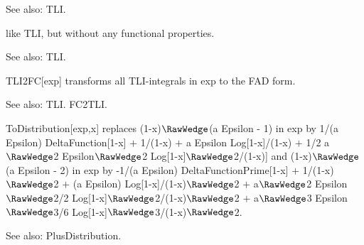 
See also:  TLI.





like TLI, but without any functional properties.

See also:  TLI.



TLI2FC[exp] transforms all TLI-integrals in exp to the FAD form.



See also: { }TLI. { }FC2TLI.





ToDistribution[exp,x] replaces (1-x)\(\RawWedge\)(a Epsilon - 1) in exp by 1/(a Epsilon) DeltaFunction[1-x] \(+\) 1/(1-x) \(+\) a Epsilon
  Log[1-x]/(1-x) \(+\) 1/2 a\(\RawWedge\)2 Epsilon\(\RawWedge\)2 Log[1-x]\(\RawWedge\)2/(1-x)] and (1-x)\(\RawWedge\)(a Epsilon - 2) in
  exp by -1/(a Epsilon) DeltaFunctionPrime[1-x] \(+\) 1/(1-x)\(\RawWedge\)2 \(+\) (a Epsilon) Log[1-x]/(1-x)\(\RawWedge\)2 \(+\)
  a\(\RawWedge\)2 Epsilon\(\RawWedge\)2/2 Log[1-x]\(\RawWedge\)2/(1-x)\(\RawWedge\)2 \(+\) a\(\RawWedge\)3 Epsilon\(\RawWedge\)3/6
  Log[1-x]\(\RawWedge\)3/(1-x)\(\RawWedge\)2.



See also:  PlusDistribution.



